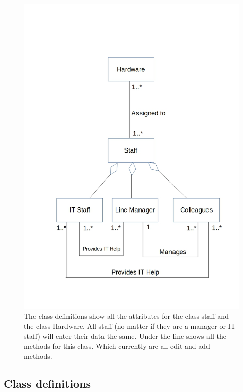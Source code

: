 \begin{figure}[H]
\hspace*{-1.3cm}
\vspace*{-1cm}
\includegraphics[width=1\textwidth]{RelationshipDiagram.jpg}
\caption{The class definitions show all the attributes for the class staff and the class Hardware. All staff (no matter if they are a manager or IT staff) will enter their data the same. Under the line shows all the methods for this class. Which currently are all edit and add methods.} \label{Relationship Diagrams}
\end{figure}

\subsection{Class definitions}

